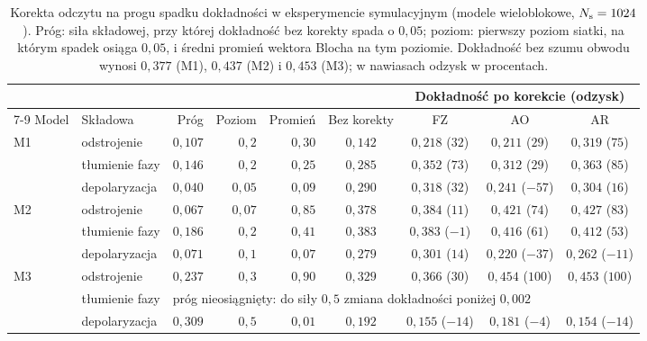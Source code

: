 \begin{table}[htb]
\centering
\caption[Korekta odczytu na progu spadku dokładności w eksperymencie symulacyjnym]{Korekta odczytu na progu spadku dokładności w eksperymencie symulacyjnym (modele wieloblokowe, $N_{\mathrm{s}}=1024$). Próg: siła składowej, przy której dokładność bez korekty spada o $0{,}05$; poziom: pierwszy poziom siatki, na którym spadek osiąga $0{,}05$, i średni promień wektora Blocha na tym poziomie. Dokładność bez szumu obwodu wynosi $0{,}377$ (M1), $0{,}437$ (M2) i $0{,}453$ (M3); w nawiasach odzysk w procentach.}
\label{tab:cls:pdu-recovery}
\footnotesize
\setlength{\tabcolsep}{4pt}
\begin{tabular}{@{}llrrrcccc@{}}
\toprule
 & & & & & & \multicolumn{3}{c}{Dokładność po korekcie (odzysk)} \\
\cmidrule(l){7-9}
Model & Składowa & Próg & Poziom & Promień & Bez korekty & FZ & AO & AR \\
\midrule
M1 & odstrojenie & $0{,}107$ & $0{,}2$ & $0{,}30$ & $0{,}142$ & $0{,}218$ ($32$) & $0{,}211$ ($29$) & $0{,}319$ ($75$) \\
 & tłumienie fazy & $0{,}146$ & $0{,}2$ & $0{,}25$ & $0{,}285$ & $0{,}352$ ($73$) & $0{,}312$ ($29$) & $0{,}363$ ($85$) \\
 & depolaryzacja & $0{,}040$ & $0{,}05$ & $0{,}09$ & $0{,}290$ & $0{,}318$ ($32$) & $0{,}241$ ($-57$) & $0{,}304$ ($16$) \\
\addlinespace
M2 & odstrojenie & $0{,}067$ & $0{,}07$ & $0{,}85$ & $0{,}378$ & $0{,}384$ ($11$) & $0{,}421$ ($74$) & $0{,}427$ ($83$) \\
 & tłumienie fazy & $0{,}186$ & $0{,}2$ & $0{,}41$ & $0{,}383$ & $0{,}383$ ($-1$) & $0{,}416$ ($61$) & $0{,}412$ ($53$) \\
 & depolaryzacja & $0{,}071$ & $0{,}1$ & $0{,}07$ & $0{,}279$ & $0{,}301$ ($14$) & $0{,}220$ ($-37$) & $0{,}262$ ($-11$) \\
\addlinespace
M3 & odstrojenie & $0{,}237$ & $0{,}3$ & $0{,}90$ & $0{,}329$ & $0{,}366$ ($30$) & $0{,}454$ ($100$) & $0{,}453$ ($100$) \\
 & tłumienie fazy & \multicolumn{7}{l}{próg nieosiągnięty: do siły $0{,}5$ zmiana dokładności poniżej $0{,}002$} \\
 & depolaryzacja & $0{,}309$ & $0{,}5$ & $0{,}01$ & $0{,}192$ & $0{,}155$ ($-14$) & $0{,}181$ ($-4$) & $0{,}154$ ($-14$) \\
\bottomrule
\end{tabular}
\end{table}
